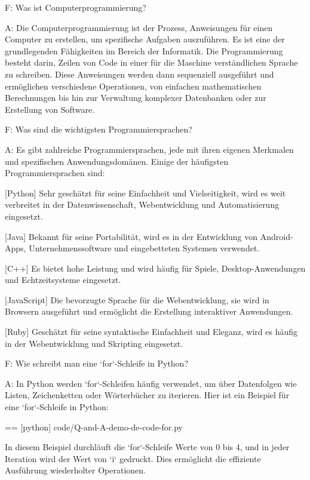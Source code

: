 
F:
  Was ist Computerprogrammierung?

A:
  Die Computerprogrammierung ist der Prozess, Anweisungen für einen Computer zu erstellen, um spezifische Aufgaben auszuführen. Es ist eine der grundlegenden Fähigkeiten im Bereich der Informatik. Die Programmierung besteht darin, Zeilen von Code in einer für die Maschine verständlichen Sprache zu schreiben. Diese Anweisungen werden dann sequenziell ausgeführt und ermöglichen verschiedene Operationen, von einfachen mathematischen Berechnungen bis hin zur Verwaltung komplexer Datenbanken oder zur Erstellung von Software.

F:
  Was sind die wichtigsten Programmiersprachen?

A:
  Es gibt zahlreiche Programmiersprachen, jede mit ihren eigenen Merkmalen und spezifischen Anwendungsdomänen. Einige der häufigsten Programmiersprachen sind:

  [Python]
    Sehr geschätzt für seine Einfachheit und Vielseitigkeit, wird es weit verbreitet in der Datenwissenschaft, Webentwicklung und Automatisierung eingesetzt.

  [Java]
    Bekannt für seine Portabilität, wird es in der Entwicklung von Android-Apps, Unternehmenssoftware und eingebetteten Systemen verwendet.

  [C++]
    Es bietet hohe Leistung und wird häufig für Spiele, Desktop-Anwendungen und Echtzeitsysteme eingesetzt.

  [JavaScript]
    Die bevorzugte Sprache für die Webentwicklung, sie wird in Browsern ausgeführt und ermöglicht die Erstellung interaktiver Anwendungen.

  [Ruby]
    Geschätzt für seine syntaktische Einfachheit und Eleganz, wird es häufig in der Webentwicklung und Skripting eingesetzt.

F:
  Wie schreibt man eine `for`-Schleife in Python?

A:
  In Python werden `for`-Schleifen häufig verwendet, um über Datenfolgen wie Listen, Zeichenketten oder Wörterbücher zu iterieren. Hier ist ein Beispiel für eine `for`-Schleife in Python:

  == [python] {code/Q-and-A-demo-de-code-for.py}

  In diesem Beispiel durchläuft die `for`-Schleife Werte von 0 bis 4, und in jeder Iteration wird der Wert von `i` gedruckt. Dies ermöglicht die effiziente Ausführung wiederholter Operationen.

